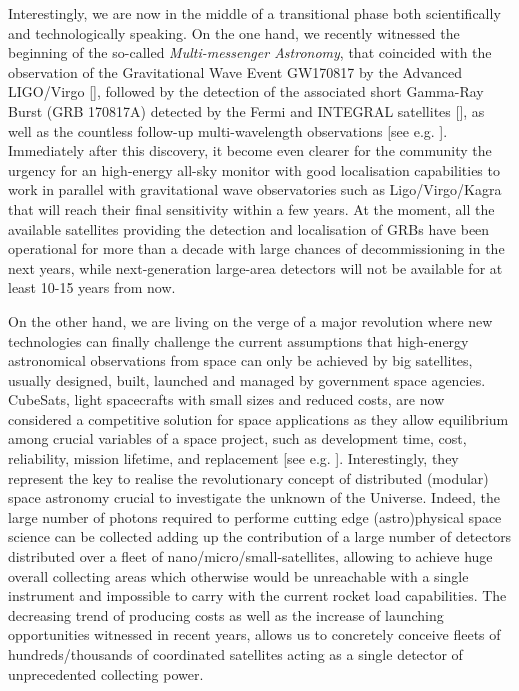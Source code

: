 \documentclass[]{spie}  %
\begin{document}
Interestingly, we are now in the middle of a transitional phase both scientifically and technologically speaking. On the one hand, we recently witnessed the beginning of the so-called \emph{Multi-messenger Astronomy}, that coincided with the observation of the Gravitational Wave Event GW170817 by the Advanced LIGO/Virgo [], followed by the detection of the associated short Gamma-Ray Burst (GRB 170817A) detected by the Fermi and INTEGRAL satellites [], as well as the countless follow-up multi-wavelength observations [see e.g. ]. Immediately after this discovery, it become even clearer for the community the urgency for an high-energy all-sky monitor with good localisation capabilities to work in parallel with gravitational wave observatories such as Ligo/Virgo/Kagra that will reach their final sensitivity within a few years. At the moment, all the available satellites providing the detection and localisation of GRBs have been operational for more than a decade with large chances of decommissioning in the next years, while next-generation large-area detectors will not be available for at least 10-15 years from now. 

On the other hand, we are living on the verge of a major revolution where new technologies can finally challenge the current assumptions that high-energy astronomical observations from space can only be achieved by big satellites, usually designed, built, launched and managed by government space agencies. CubeSats, light spacecrafts with small sizes and reduced costs, are now considered a competitive solution for space applications as they allow equilibrium among crucial variables of a space project, such as development time, cost, reliability, mission lifetime, and replacement [see e.g. ]. Interestingly, they represent the key to realise the revolutionary concept of distributed (modular) space astronomy crucial to investigate the unknown of the Universe. Indeed, the large number of photons required to performe cutting edge (astro)physical space science can be collected adding up the contribution of a large number of detectors distributed over a fleet of nano/micro/small-satellites, allowing to achieve huge overall collecting areas which otherwise would be unreachable with a single instrument and impossible to carry with the current rocket load capabilities. The decreasing trend of producing costs as well as the increase of launching opportunities witnessed in recent years, allows us to concretely conceive fleets of hundreds/thousands of coordinated satellites acting as a single detector of unprecedented collecting power.
\end{document}

